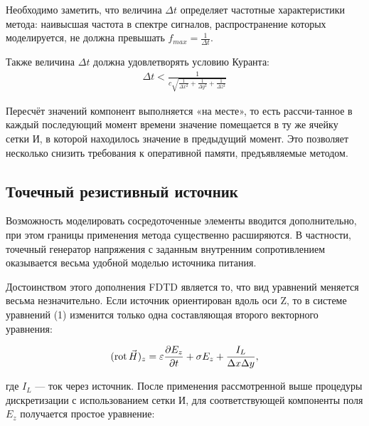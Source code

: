 Необходимо заметить, что величина $ \Delta{t} $ определяет частотные характеристики метода: наивысшая частота в спектре сигналов, распространение которых моделируется, не должна превышать $ f_{max} = \frac{1}{\Delta{t}} $.

Также величина $ \Delta{t} $ должна удовлетворять условию Куранта:
\begin{align*}
\Delta{t} < \frac{1}{c\sqrt{\frac{1}{\Delta{x}^2} + \frac{1}{\Delta{y}^2} + \frac{1}{\Delta{z}^2}}}
\end{align*}

Пересчёт значений компонент выполняется «на месте», то есть рассчи-танное в каждый последующий момент времени значение помещается в ту же ячейку сетки И, в которой находилось значение в предыдущий момент. Это позволяет несколько снизить требования к оперативной памяти, предъявляемые методом.

\subsection{Точечный резистивный источник}

Возможность моделировать сосредоточенные элементы вводится дополнительно, при этом границы применения метода существенно расширяются. В частности, точечный генератор напряжения с заданным внутренним сопротивлением оказывается весьма удобной моделью источника питания.

Достоинством этого дополнения FDTD является то, что вид уравнений меняется весьма незначительно. Если источник ориентирован вдоль оси Z, то в системе уравнений (1) изменится только одна составляющая второго векторного уравнения:

\begin{equation}
    \label{eq:LumpedSource:MaxwellEquationsAmendment}
    (\operatorname{rot}\vec{H})_z = \varepsilon\frac{\partial{E_z}}{\partial{t}} +
        \sigma E_z + \frac{I_L}{\Delta{x}\Delta{y}},
\end{equation}

где $ I_L $ --- ток через источник.
После применения рассмотренной выше процедуры дискретизации с использованием сетки И, для соответствующей компоненты поля $ E_z $ получается простое уравнение:

